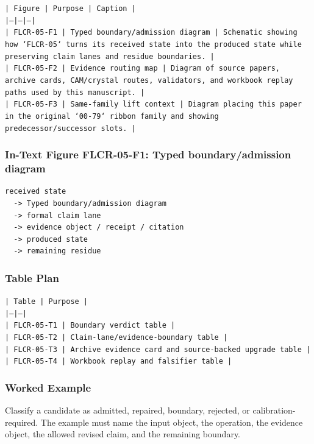 \documentclass[11pt]{article}
\begin{document}
\noindent\texttt{| Figure | Purpose | Caption |}\\
\noindent\texttt{|---|---|---|}\\
\noindent\texttt{| FLCR-05-F1 | Typed boundary/admission diagram | Schematic showing how `FLCR-05` turns its received state into the produced state while preserving claim lanes and residue boundaries. |}\\
\noindent\texttt{| FLCR-05-F2 | Evidence routing map | Diagram of source papers, archive cards, CAM/crystal routes, validators, and workbook replay paths used by this manuscript. |}\\
\noindent\texttt{| FLCR-05-F3 | Same-family lift context | Diagram placing this paper in the original `00-79` ribbon family and showing predecessor/successor slots. |}\\

\subsubsection*{In-Text Figure FLCR-05-F1: Typed boundary/admission diagram}

\begin{verbatim}
received state
  -> Typed boundary/admission diagram
  -> formal claim lane
  -> evidence object / receipt / citation
  -> produced state
  -> remaining residue
\end{verbatim}

\subsubsection*{Table Plan}

\noindent\texttt{| Table | Purpose |}\\
\noindent\texttt{|---|---|}\\
\noindent\texttt{| FLCR-05-T1 | Boundary verdict table |}\\
\noindent\texttt{| FLCR-05-T2 | Claim-lane/evidence-boundary table |}\\
\noindent\texttt{| FLCR-05-T3 | Archive evidence card and source-backed upgrade table |}\\
\noindent\texttt{| FLCR-05-T4 | Workbook replay and falsifier table |}\\

\subsubsection*{Worked Example}

Classify a candidate as admitted, repaired, boundary, rejected, or calibration-required. The example must name the input object, the operation,
the evidence object, the allowed revised claim, and the remaining boundary.
\end{document}
